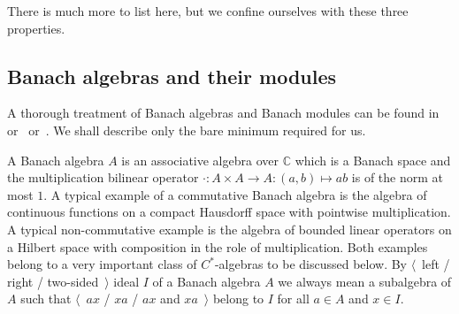There is much more to list here, but we confine ourselves with these three
properties.


\subsection{
  Banach algebras and their modules}\label{SubSectionBanachAlgebrasAndTheirModules}

A thorough treatment of Banach algebras and Banach modules can be found
in~\cite{HelBanLocConvAlg} or~\cite{HelHomolBanTopAlg}
or~\cite{DalBanAlgAutCont}. We shall describe only the bare minimum required for
us.

A Banach algebra $A$ is an associative algebra over $\mathbb{C}$ which is a
Banach space and the multiplication bilinear operator 
$\cdot:A\times A\to A:(a,b)\mapsto ab$ is of the norm at most $1$. A typical
example of a commutative Banach algebra is the algebra of continuous functions on
a compact Hausdorff space with pointwise multiplication. A typical non-commutative 
example is the algebra of bounded linear operators on a Hilbert
space with composition in the role of multiplication. Both examples belong to a
very important class of $C^*$-algebras to be discussed below. By $\langle$~left
/ right / two-sided~$\rangle$ ideal $I$ of a Banach algebra $A$ we always mean 
a subalgebra of $A$ such that $\langle$~$ax$ / $xa$ / $ax$ and
$xa$~$\rangle$ belong to $I$ for all $a\in A$ and $x\in I$.


